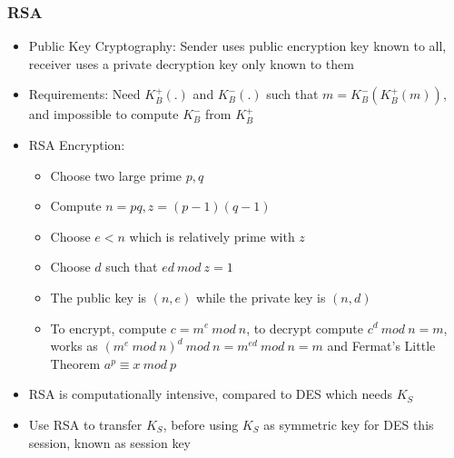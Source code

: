 \documentclass[10pt, landscape]{article}
\begin{document}
\begin{multicols*}{3}
\subsubsection{RSA}
\begin{itemize}
    \item Public Key Cryptography: Sender uses public encryption key known to all, receiver uses a private decryption key only known to them
    \item Requirements: Need $K_B^+(.)$ and $K_B^-(.)$ such that $m=K_B^-(K_B^+(m))$, and impossible to compute $K_B^-$ from $K_B^+$
    \item RSA Encryption:
    \begin{itemize}
        \item Choose two large prime $p, q$
        \item Compute $n=pq, z=(p-1)(q-1)$
        \item Choose $e<n$ which is relatively prime with $z$
        \item Choose $d$ such that $ed\ mod \ z=1$
        \item The public key is $(n,e)$ while the private key is $(n,d)$
        \item To encrypt, compute $c=m^e\ mod \ n$, to decrypt compute $c^d\ mod \ n=m$, works as $(m^e\ mod \ n)^d\ mod \ n=m^{ed} \ mod \ n=m$ and Fermat's Little Theorem $a^p\equiv x \ mod\ p$
    \end{itemize}
    \item RSA is computationally intensive, compared to DES which needs $K_S$
    \item Use RSA to transfer $K_S$, before using $K_S$ as symmetric key for DES this session, known as session key
\end{itemize}


\end{multicols*}
\end{document}
